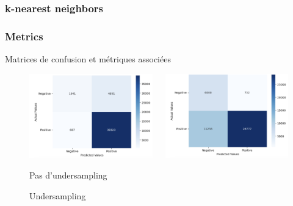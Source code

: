 \documentclass{beamer}
\begin{document}
\begin{frame}
\frametitle{k-nearest neighbors}
\end{frame}

\begin{frame}
\frametitle{Metrics}

\vspace{1em} %

\caption{Matrices de confusion et métriques associées}
\begin{figure}
    \begin{columns}[T]
    \begin{column}{0.5\textwidth}
        \centering
        \includegraphics[width=\textwidth]{nb_mat_no_undersampling.png} 
        \caption{Pas d'undersampling}
    \end{column}
    \hfill
    \begin{column}{0.5\textwidth}
        \centering
        \includegraphics[width=\textwidth]{nb_mat_undersampling.png}
        \caption{Undersampling}
    \end{column}
    \end{columns}
\end{figure}


\end{frame}
\end{document}
